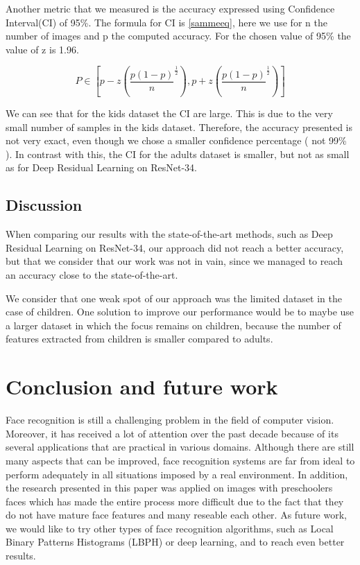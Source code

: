 \documentclass[runningheads,a4paper,11pt]{report}
\begin{document}
Another metric that we measured is the accuracy expressed using Confidence Interval(CI) of 95\%. The formula for CI is \ref{sammeeq}, here we use for n the number of images and p the computed accuracy. For the chosen value of 95\% the value of z is 1.96.

\begin{equation}\label{sammeeq}
P \in [ p - z( \frac{p (1 - p)}{n} ^{\frac{1}{2}} ) , p + z(\frac{p (1 - p)}{n} ^{\frac{1}{2}}) ]
\end{equation}

We can see that for the kids dataset the CI are large. This is due to the very small number of samples in the kids dataset. Therefore, the accuracy presented is not very exact, even though we chose a smaller confidence percentage ( not 99\% ). In contrast with this, the CI for the adults dataset is smaller, but not as small as for Deep Residual Learning on ResNet-34.


\section{Discussion}
\label{section:discussion}

When comparing our results with the state-of-the-art methods, such as Deep Residual Learning on ResNet-34, our approach did not reach a better accuracy, but that we consider that our work was not in vain, since we managed to reach an accuracy close to the state-of-the-art.

We consider that one weak spot of our approach was the limited dataset in the case of children. One solution to improve our performance would be to maybe use a larger dataset in which the focus remains on children, because the number of features extracted from children is smaller compared to adults.

\chapter{Conclusion and future work}
\label{chapter:concl}
Face recognition is still a challenging problem in the field of computer vision. Moreover, it has received a lot of attention over the past decade because of its several applications that are practical in various domains. Although there are still many aspects that can be improved, face recognition systems are far from ideal to perform adequately in all situations imposed by a real environment.
In addition, the research presented in this paper was applied on images with preschoolers faces which has made the entire process more difficult due to the fact that they do not have mature face features and many reseable each other.
As future work, we would like to try other types of face recognition algorithms, such as Local Binary Patterns Histograms (LBPH) or deep learning, and to reach even better results.





\end{document}
